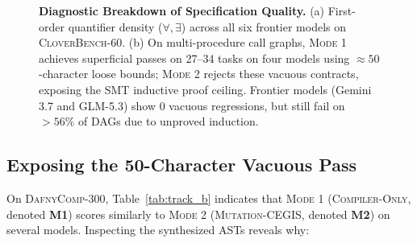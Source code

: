 \documentclass{article}
\begin{document}
\begin{figure}[t]
\begin{minipage}[t]{0.48\textwidth}
\end{minipage}
\caption{\textbf{Diagnostic Breakdown of Specification Quality.} (a) First-order quantifier density ($\forall, \exists$) across all six frontier models on \textsc{CloverBench-60}. (b) On multi-procedure call graphs, \textsc{Mode 1} achieves superficial passes on 27--34 tasks on four models using $\approx 50$-character loose bounds; \textsc{Mode 2} rejects these vacuous contracts, exposing the SMT inductive proof ceiling. Frontier models (Gemini 3.7 and GLM-5.3) show 0 vacuous regressions, but still fail on $>56\%$ of DAGs due to unproved induction.}
\label{fig:qualitative_diagnostics}
\end{figure}

\subsection{Exposing the 50-Character Vacuous Pass}

On \textsc{DafnyComp-300}, Table~\ref{tab:track_b} indicates that \textsc{Mode 1} (\textsc{Compiler-Only}, denoted \textbf{M1}) scores similarly to \textsc{Mode 2} (\textsc{Mutation-CEGIS}, denoted \textbf{M2}) on several models. Inspecting the synthesized ASTs reveals why:
\end{document}
